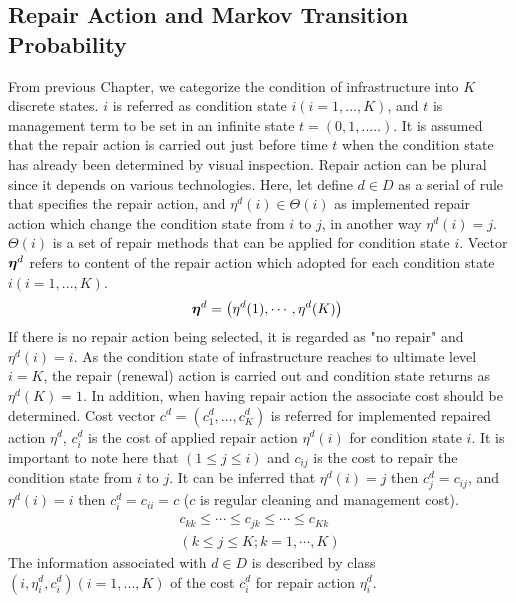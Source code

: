 \subsection{Repair Action and Markov Transition Probability}
\label{631}
From previous Chapter, we categorize the condition of infrastructure into $K$ discrete states. $i$ is referred as condition state $i(i=1,...,K)$, and $t$ is management term to be set in an infinite state $t = (0, 1, .....)$. It is assumed that the repair action is carried out just before time $t$ when the condition state has already been determined by visual inspection. Repair action can be plural since it depends on various technologies. Here, let define $d\in D$ as a serial of rule that specifies the repair action, and $\eta^d(i) \in \Theta(i)$ as implemented repair action which change the condition state from $i$ to $j$, in another way $\eta^d(i) =j$. $\Theta(i)$ is a set of repair methods that can be applied for condition state $i$. Vector $\mbox{\boldmath$\eta$}^{d}$ refers to content of the repair action which adopted for each condition state $i (i=1,...,K)$.
\begin{eqnarray}
&& \mbox{\boldmath$\eta$}^{d}=\left(\eta^{d}(1),\cdots,\eta^{d}(K)\right) \label{shu}
\end{eqnarray}
If there is no repair action being selected, it is regarded as "no repair" and $\eta^{d}(i)=i$. As the condition state of infrastructure reaches to ultimate level $i=K$, the repair (renewal) action is carried out and condition state returns as $\eta^d(K)=1$. In addition, when having repair action the associate cost should be determined.  Cost vector $c^d = (c^{d}_1,...,c^{d}_K)$ is referred for implemented repaired action $\eta^d$, $c^{d}_i$ is the cost of applied repair action $\eta^d(i)$ for condition state $i$. It is important to note here that $(1 \leq j \leq i)$ and $c_{ij}$ is the cost to repair the condition state from $i$ to $j$. It can be inferred that $\eta^d(i) = j$ then $c^d_{j} = c_{ij}$, and $\eta^d(i) = i$ then $c^d_{i} = c_{ii} = c$ ($c$ is regular cleaning and management cost).
\begin{eqnarray}
c_{kk}\le \cdots \le c_{jk}\le \cdots \le c_{Kk}\\
(k \le j \le K;k=1,\cdots ,K) \nonumber
\end{eqnarray}
The information associated with $d \in D$ is described by class $(i, \eta^d_i, c^d_i) (i =1,...,K)$ of the cost $c^d_i$ for repair action $\eta^d_i$.

